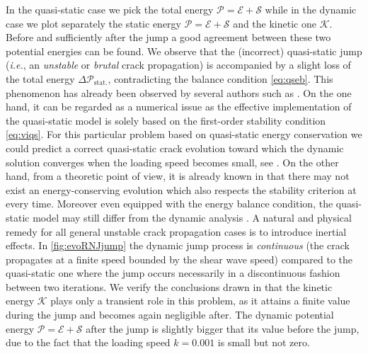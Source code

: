 In the quasi-static case we pick the total energy $\mathcal{P}=\mathcal{E}+\mathcal{S}$ while in the dynamic case we plot separately the static energy $\mathcal{P}=\mathcal{E}+\mathcal{S}$ and the kinetic one $\mathcal{K}$. Before and sufficiently after the jump a good agreement between these two potential energies can be found. We observe that the (incorrect) quasi-static jump (\emph{i.e.}, an \emph{unstable} or \emph{brutal} crack propagation) is accompanied by a slight loss of the total energy $\Delta \mathcal{P}_\mathrm{stat.}$, contradicting the balance condition \eqref{eq:qseb}. This phenomenon has already been observed by several authors such as \cite{BourdinFrancfortMarigo:2008,AmorMarigoMaurini:2009,PhamAmorMarigoMaurini:2011,Bourdin:2011}. On the one hand, it can be regarded as a numerical issue as the effective implementation of the quasi-static model is solely based on the first-order stability condition \eqref{eq:viqs}. For this particular problem based on quasi-static energy conservation we could predict a correct quasi-static crack evolution toward which the dynamic solution converges when the loading speed becomes small, see \cite{DumouchelMarigoCharlotte:2008}. On the other hand, from a theoretic point of view, it is already known in \cite{Pham:2010} that there may not exist an energy-conserving evolution which also respects the stability criterion at every time. Moreover even equipped with the energy balance condition, the quasi-static model may still differ from the dynamic analysis \cite{LazzaroniBargelliniDumouchelMarigo:2012}. A natural and physical remedy for all general unstable crack propagation cases is to introduce inertial effects. In \cref{fig:evoRNJjump} the dynamic jump process is \emph{continuous} (the crack propagates at a finite speed bounded by the shear wave speed) compared to the quasi-static one where the jump occurs necessarily in a discontinuous fashion between two iterations. We verify the conclusions drawn in \cite{DumouchelMarigoCharlotte:2008} that the kinetic energy $\mathcal{K}$ plays only a transient role in this problem, as it attains a finite value during the jump and becomes again negligible after. The dynamic potential energy $\mathcal{P}=\mathcal{E}+\mathcal{S}$ after the jump is slightly bigger that its value before the jump, due to the fact that the loading speed $k=0.001$ is small but not zero.

